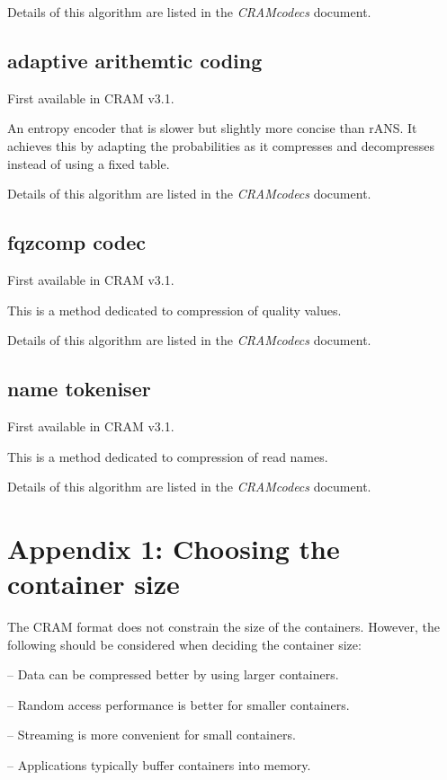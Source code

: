 \documentclass[a4paper]{article}
\begin{document}
Details of this algorithm are listed in the \textit{CRAMcodecs} document.

\subsection{\textbf{adaptive arithemtic coding}}

First available in CRAM v3.1.

An entropy encoder that is slower but slightly more concise than
rANS.  It achieves this by adapting the probabilities as it compresses
and decompresses instead of using a fixed table.

Details of this algorithm are listed in the \textit{CRAMcodecs} document.

\subsection{\textbf{fqzcomp codec}}

First available in CRAM v3.1.

This is a method dedicated to compression of quality values.

Details of this algorithm are listed in the \textit{CRAMcodecs} document.

\subsection{\textbf{name tokeniser}}

First available in CRAM v3.1.

This is a method dedicated to compression of read names.

Details of this algorithm are listed in the \textit{CRAMcodecs} document.

\section*{Appendix 1: Choosing the container size}

The CRAM format does not constrain the size of the containers.
However, the following should be considered when deciding the container size:

-- Data can be compressed better by using larger containers.

-- Random access performance is better for smaller containers.

-- Streaming is more convenient for small containers.

-- Applications typically buffer containers into memory.
\end{document}
